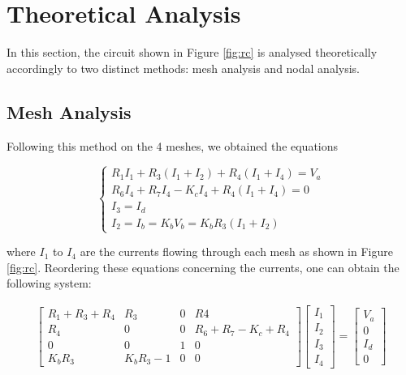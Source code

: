\section{Theoretical Analysis}
\label{sec:analysis}

In this section, the circuit shown in Figure \ref{fig:rc} is analysed
theoretically accordingly to two distinct methods: mesh analysis and nodal analysis.

\subsection{Mesh Analysis}

Following this method on the 4 meshes, we obtained the equations

\begin{equation}
\begin{cases}
R_1 I_1 + R_3 (I_1+I_2)+R_4(I_1+I_4)=V_a\\
R_6 I_4 + R_7 I_4 -K_c I_4 + R_4 (I_1+I_4)=0\\
I_3=I_d\\
I_2=I_b=K_b V_b = K_b R_3 (I_1+I_2)
\end{cases}
\end{equation}

where $I_1$ to $I_4$ are the currents flowing through each mesh as shown in Figure \ref{fig:rc}. Reordering these equations concerning the currents, one can obtain the following system:

\begin{gather}
    \begin{bmatrix}
     R_1+R_3+R_4 & R_3 & 0 & R4 \\
     R_4 & 0 & 0 & R_6+R_7-K_c+R_4\\
     0 & 0 & 1 & 0 \\
     K_b R_3 & K_b R_3 -1 & 0 & 0 
    \end{bmatrix}
    \begin{bmatrix}
     I_1\\
     I_2\\
     I_3\\
     I_4
    \end{bmatrix}
    =
    \begin{bmatrix}
     V_a\\
     0\\
     I_d\\
     0
    \end{bmatrix}
\end{gather}

